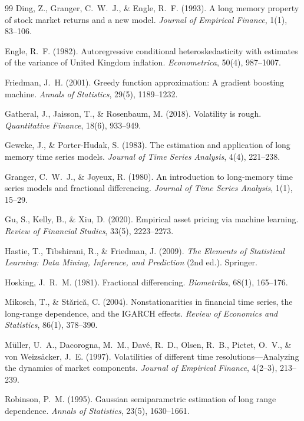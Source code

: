 \documentclass[12pt]{article}
\begin{document}
\begin{thebibliography}{99}
Ding, Z., Granger, C.~W.~J., \& Engle, R.~F. (1993).
\newblock A long memory property of stock market returns and a new model.
\newblock \emph{Journal of Empirical Finance}, 1(1), 83--106.

Engle, R.~F. (1982).
\newblock Autoregressive conditional heteroskedasticity with estimates of the variance of United Kingdom inflation.
\newblock \emph{Econometrica}, 50(4), 987--1007.

Friedman, J.~H. (2001).
\newblock Greedy function approximation: A gradient boosting machine.
\newblock \emph{Annals of Statistics}, 29(5), 1189--1232.

Gatheral, J., Jaisson, T., \& Rosenbaum, M. (2018).
\newblock Volatility is rough.
\newblock \emph{Quantitative Finance}, 18(6), 933--949.

Geweke, J., \& Porter-Hudak, S. (1983).
\newblock The estimation and application of long memory time series models.
\newblock \emph{Journal of Time Series Analysis}, 4(4), 221--238.

Granger, C.~W.~J., \& Joyeux, R. (1980).
\newblock An introduction to long-memory time series models and fractional differencing.
\newblock \emph{Journal of Time Series Analysis}, 1(1), 15--29.

Gu, S., Kelly, B., \& Xiu, D. (2020).
\newblock Empirical asset pricing via machine learning.
\newblock \emph{Review of Financial Studies}, 33(5), 2223--2273.

Hastie, T., Tibshirani, R., \& Friedman, J. (2009).
\newblock \emph{The Elements of Statistical Learning: Data Mining, Inference, and Prediction} (2nd ed.).
\newblock Springer.

Hosking, J.~R.~M. (1981).
\newblock Fractional differencing.
\newblock \emph{Biometrika}, 68(1), 165--176.

Mikosch, T., \& St\u{a}ric\u{a}, C. (2004).
\newblock Nonstationarities in financial time series, the long-range dependence, and the IGARCH effects.
\newblock \emph{Review of Economics and Statistics}, 86(1), 378--390.

M\"uller, U.~A., Dacorogna, M.~M., Dav\'{e}, R.~D., Olsen, R.~B., Pictet, O.~V., \& von Weizs\"acker, J.~E. (1997).
\newblock Volatilities of different time resolutions---Analyzing the dynamics of market components.
\newblock \emph{Journal of Empirical Finance}, 4(2--3), 213--239.

Robinson, P.~M. (1995).
\newblock Gaussian semiparametric estimation of long range dependence.
\newblock \emph{Annals of Statistics}, 23(5), 1630--1661.

\end{thebibliography}
\end{document}
